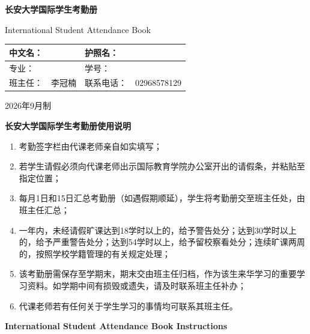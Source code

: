 \documentclass[UTF8,fontset=fandol,12pt]{ctexart}
\newcommand{\ChineseName}{\underline{\hspace{38mm}}}
\newcommand{\PassportName}{\underline{\hspace{65mm}}}
\newcommand{\Major}{\underline{\hspace{55mm}}}
\newcommand{\StudentId}{\underline{\hspace{42mm}}}
\newcommand{\HeadTeacher}{李冠楠}
\newcommand{\TeacherPhone}{02968578129}
\newcommand{\IssueYear}{2026}
\newcommand{\IssueMonth}{9}
\begin{document}
\begin{center}
\vspace*{12mm}
{\Huge\bfseries 长安大学国际学生考勤册}\par\vspace{5mm}
{\Large International Student Attendance Book}\par\vspace{20mm}
\begin{tabularx}{.86\linewidth}{|l|X|l|X|}\hline
中文名：&\ChineseName&护照名：&\PassportName\\[7mm]\hline
专业：&\Major&学号：&\StudentId\\[7mm]\hline
班主任：&\HeadTeacher&联系电话：&\TeacherPhone\\[7mm]\hline
\end{tabularx}\par\vspace{20mm}
{\Large \IssueYear 年\IssueMonth 月制}
\end{center}
\clearpage
\begin{center}\Large\bfseries 长安大学国际学生考勤册使用说明\end{center}
\begin{enumerate}
\item 考勤签字栏由代课老师亲自如实填写；
\item 若学生请假必须向代课老师出示国际教育学院办公室开出的请假条，并粘贴至指定位置；
\item 每月1日和15日汇总考勤册（如遇假期顺延），学生将考勤册交至班主任处，由班主任汇总；
\item 一年内，未经请假旷课达到18学时以上的，给予警告处分；达到30学时以上的，给予严重警告处分；达到54学时以上，给予留校察看处分；连续旷课两周的，按照学校学籍管理的有关规定处理；
\item 该考勤册需保存至学期末，期末交由班主任归档，作为该生来华学习的重要学习资料。如学期中间有损毁或遗失，请及时联系班主任补办；
\item 代课老师若有任何关于学生学习的事情均可联系其班主任。
\end{enumerate}
\clearpage
\begin{center}\Large\bfseries International Student Attendance Book Instructions\end{center}
\end{document}
